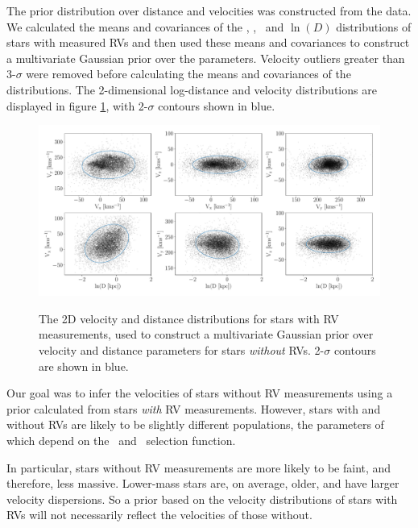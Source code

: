 The prior distribution over distance and velocities was constructed from the
data.
We calculated the means and covariances of the \vx, \vy, \vz\ and $\ln(D)$
distributions of stars with measured RVs and then used these means and
covariances to construct a multivariate Gaussian prior over the parameters.
Velocity outliers greater than 3-$\sigma$ were removed before calculating the
means and covariances of the distributions.
The 2-dimensional log-distance and velocity distributions are displayed in
figure \ref{fig:prior_distributions_2D}, with 2-$\sigma$ contours shown in
blue.
\begin{figure}[ht!]
\caption{
The 2D velocity and distance distributions for stars with RV measurements,
    used to construct a multivariate Gaussian prior over velocity and
    distance parameters for stars {\it without} RVs.
2-$\sigma$ contours are shown in blue.
}
  \centering
    \includegraphics[width=1\textwidth]{prior_distributions_2D}
\label{fig:prior_distributions_2D}
\end{figure}

Our goal was to infer the velocities of stars without RV measurements using a
prior calculated from stars {\it with} RV measurements.
However, stars with and without RVs are likely to be slightly different
populations, the parameters of which depend on the \gaia\ and \lamost\
selection function.

In particular, stars without RV measurements are more likely to be faint, and
therefore, less massive.
Lower-mass stars are, on average, older, and have larger velocity dispersions.
So a prior based on the velocity distributions of stars with RVs will not
necessarily reflect the velocities of those without.

